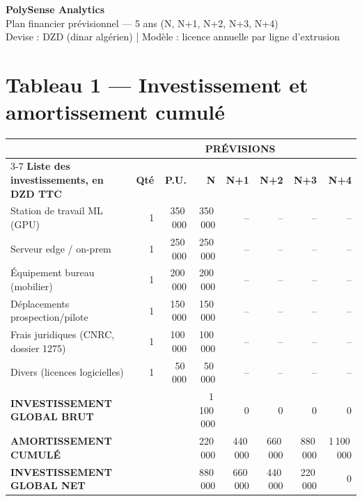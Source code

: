 \documentclass[11pt,a4paper]{article}
\begin{document}
\begin{center}
{\Large\bfseries\color{blue!70!black} PolySense Analytics\\[2mm]}
{\large Plan financier prévisionnel — 5 ans (N, N+1, N+2, N+3, N+4)}\\[2mm]
{\small Devise : DZD (dinar algérien) \quad | \quad Modèle : licence annuelle par ligne d'extrusion}
\end{center}

\section{Tableau 1 — Investissement et amortissement cumulé}

\begin{center}
\small
\begin{longtable}{l r r r r r r r}
\toprule
 & & \multicolumn{5}{c}{\textbf{PRÉVISIONS}} & \\
\cmidrule(lr){3-7}
\textbf{Liste des investissements, en DZD TTC} & \textbf{Qté} & \textbf{P.U.} & \textbf{N} & \textbf{N+1} & \textbf{N+2} & \textbf{N+3} & \textbf{N+4} \\
\midrule
\endhead

Station de travail ML (GPU)        & 1 & 350\,000 & 350\,000 & --    & --    & --    & -- \\
Serveur edge / on-prem             & 1 & 250\,000 & 250\,000 & --    & --    & --    & -- \\
Équipement bureau (mobilier)       & 1 & 200\,000 & 200\,000 & --    & --    & --    & -- \\
Déplacements prospection/pilote    & 1 & 150\,000 & 150\,000 & --    & --    & --    & -- \\
Frais juridiques (CNRC, dossier 1275) & 1 & 100\,000 & 100\,000 & --    & --    & --    & -- \\
Divers (licences logicielles)       & 1 & 50\,000  & 50\,000  & --    & --    & --    & -- \\
\midrule
\rowcolor{tabletot}\color{white}\bfseries
INVESTISSEMENT GLOBAL BRUT          &   &          & 1\,100\,000 & 0 & 0 & 0 & 0 \\
\rowcolor{tabletot}\color{white}\bfseries
AMORTISSEMENT CUMULÉ                &   &          &   220\,000 &   440\,000 &   660\,000 &   880\,000 & 1\,100\,000 \\
\rowcolor{tabletot}\color{white}\bfseries
INVESTISSEMENT GLOBAL NET           &   &          &   880\,000 &   660\,000 &   440\,000 &   220\,000 & 0 \\
\bottomrule
\end{longtable}
\end{center}
\end{document}
